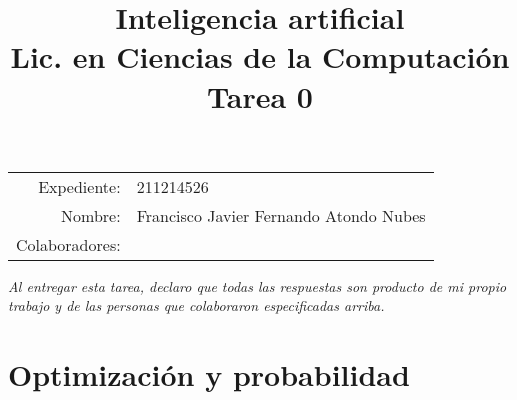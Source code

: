 \documentclass[11pt,letterpaper]{article}
\title{%
  \bfseries
  Inteligencia artificial\\%
  Lic. en Ciencias de la Computación\\%
  Tarea 0
}
\date{}
\begin{document}
\maketitle

\vspace{-2.5cm}
\begin{center}
  \begin{tabular}{rl}
    Expediente: & 211214526 \\
    Nombre: & Francisco Javier Fernando Atondo Nubes \\
    Colaboradores:
  \end{tabular}
\end{center}

{\itshape Al entregar esta tarea, declaro que todas las respuestas son
  producto de mi propio trabajo y de las personas que colaboraron
  especificadas arriba.}



\section*{Optimización y probabilidad}
\end{document}
